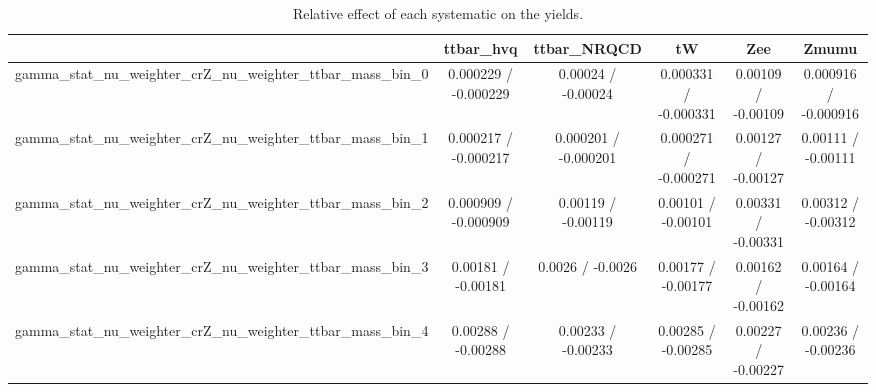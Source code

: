 \documentclass[10pt]{article}
\begin{document}
\begin{table}[htbp]
\begin{center}
\begin{tabular}{|c|c|c|c|c|c|}
\hline 
      & ttbar_hvq      & ttbar_NRQCD      & tW      & Zee      & Zmumu \\ 
\hline 
  gamma_stat_nu_weighter_crZ_nu_weighter_ttbar_mass_bin_0 & 0.000229 / -0.000229 & 0.00024 / -0.00024 & 0.000331 / -0.000331 & 0.00109 / -0.00109 & 0.000916 / -0.000916 \\ 
  gamma_stat_nu_weighter_crZ_nu_weighter_ttbar_mass_bin_1 & 0.000217 / -0.000217 & 0.000201 / -0.000201 & 0.000271 / -0.000271 & 0.00127 / -0.00127 & 0.00111 / -0.00111 \\ 
  gamma_stat_nu_weighter_crZ_nu_weighter_ttbar_mass_bin_2 & 0.000909 / -0.000909 & 0.00119 / -0.00119 & 0.00101 / -0.00101 & 0.00331 / -0.00331 & 0.00312 / -0.00312 \\ 
  gamma_stat_nu_weighter_crZ_nu_weighter_ttbar_mass_bin_3 & 0.00181 / -0.00181 & 0.0026 / -0.0026 & 0.00177 / -0.00177 & 0.00162 / -0.00162 & 0.00164 / -0.00164 \\ 
  gamma_stat_nu_weighter_crZ_nu_weighter_ttbar_mass_bin_4 & 0.00288 / -0.00288 & 0.00233 / -0.00233 & 0.00285 / -0.00285 & 0.00227 / -0.00227 & 0.00236 / -0.00236 \\ 
\hline 
\end{tabular} 
\caption{Relative effect of each systematic on the yields.} 
\end{center} 
\end{table} 
\end{document}
